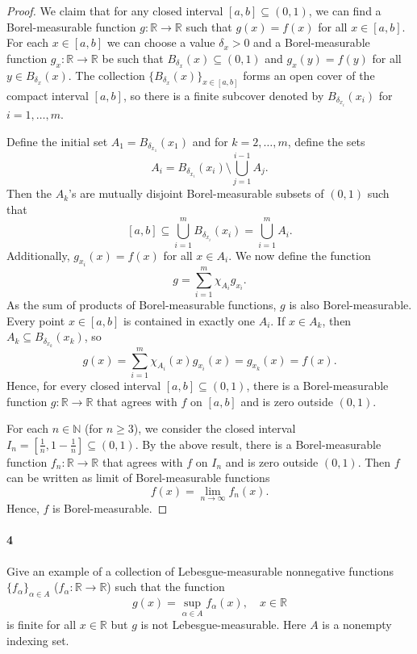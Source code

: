 \documentclass[12pt]{article}
\newlength{\myparskip}
\newenvironment{fullbox}{\begin{lrbox}{\savefullbox}\begin{minipage}{\dimexpr\textwidth-2\fboxsep\relax}\setlength{\parskip}{\myparskip}}{\end{minipage}\end{lrbox}\framebox[\textwidth]{\usebox{\savefullbox}}}
\newenvironment{pbox}[1][]{\begin{fullbox}\ifx#1\empty\else\paragraph{#1}\fi}{\end{fullbox}}
\theoremstyle{definition}
\newcommand{\N}{\mathbb{N}}
\newcommand{\R}{\mathbb{R}}
\newcommand{\<}{\langle}
\renewcommand{\>}{\rangle}
\begin{document}
\begin{proof}
    We claim that for any closed interval $[a, b] \subseteq (0, 1)$, we can find a Borel-measurable function $g : \R \to \R$ such that $g(x) = f(x)$ for all $x \in [a, b]$.
    For each $x \in [a, b]$ we can choose a value $\delta_x > 0$ and a Borel-measurable function $g_x : \R \to \R$ be  such that $B_{\delta_x}(x) \subseteq (0, 1)$ and $g_x(y) = f(y)$ for all $y \in B_{\delta_x}(x)$.
    The collection $\{B_{\delta_x}(x)\}_{x \in [a, b]}$ forms an open cover of the compact interval $[a, b]$, so there is a finite subcover denoted by $B_{\delta_{x_i}}(x_i)$ for $i = 1, \dots, m$.

    Define the initial set $A_1 = B_{\delta_{x_1}}(x_1)$ and for $k = 2, \dots, m$, define the sets
    \[
        A_i = B_{\delta_{x_i}}(x_i) \setminus \bigcup_{j=1}^{i-1} A_j.
    \]
    Then the $A_k$'s are mutually disjoint Borel-measurable subsets of $(0, 1)$ such that
    \[
        [a, b]
            \subseteq \bigcup_{i=1}^{m} B_{\delta_{x_i}}(x_i) 
            = \bigcup_{i=1}^{m} A_i.
    \]
    Additionally, $g_{x_i}(x) = f(x)$ for all $x \in A_i$.
    We now define the function
    \[
        g = \sum_{i=1}^{m} \chi_{A_i}g_{x_i}.
    \]
    As the sum of products of Borel-measurable functions, $g$ is also Borel-measurable.
    Every point $x \in [a, b]$ is contained in exactly one $A_i$. If $x \in A_k$, then $A_k \subseteq B_{\delta_{x_k}}(x_k)$, so
    \[
        g(x)
            = \sum_{i=1}^{m} \chi_{A_i}(x)g_{x_i}(x)
            = g_{x_k}(x)
            = f(x).
    \]
    Hence, for every closed interval $[a, b] \subseteq (0, 1)$, there is a Borel-measurable function $g : \R \to \R$ that agrees with $f$ on $[a, b]$ and is zero outside $(0, 1)$.

    For each $n \in \N$ (for $n \geq 3$), we consider the closed interval $I_n = [\tfrac{1}{n}, 1 - \tfrac{1}{n}] \subseteq (0, 1)$. 
    By the above result, there is a Borel-measurable function $f_n : \R \to \R$ that agrees with $f$ on $I_n$ and is zero outside $(0, 1)$. 
    Then $f$ can be written as limit of Borel-measurable functions
    \[
        f(x) = \lim_{n \to \infty} f_n(x).
    \]
    Hence, $f$ is Borel-measurable.
\end{proof}


\begin{pbox}[4]
    Give an example of a collection of Lebesgue-measurable nonnegative functions $\{f_\alpha\}_{\alpha \in A}$ ($f_\alpha : \R \to \R$) such that the function
    \[
        g(x) = \sup_{\alpha \in A} f_\alpha(x), \quad x \in \R
    \]
    is finite for all $x \in \R$ but $g$ is not Lebesgue-measurable. Here $A$ is a nonempty indexing set.
\end{pbox}
\end{document}
